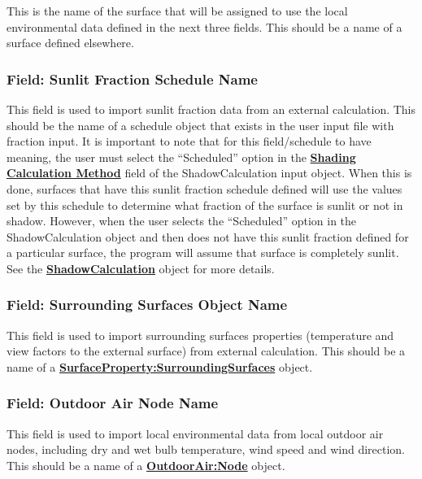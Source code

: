 This is the name of the surface that will be assigned to use the local environmental data defined in the next three fields.  This should be a name of a surface defined elsewhere.

\subsubsection{Field: Sunlit Fraction Schedule Name}\label{field-sunlit-fraction-schedule-name}

This field is used to import sunlit fraction data from an external calculation. This should be the name of a schedule object that exists in the user input file with fraction input. It is important to note that for this field/schedule to have meaning, the user must select the ``Scheduled'' option in the \textbf{\hyperref[field-shading-calculation-method]{Shading Calculation Method}} field of the ShadowCalculation input object. When this is done, surfaces that have this sunlit fraction schedule defined will use the values set by this schedule to determine what fraction of the surface is sunlit or not in shadow.  However, when the user selects the ``Scheduled'' option in the ShadowCalculation object and then does not have this sunlit fraction defined for a particular surface, the program will assume that surface is completely sunlit. See the  \textbf{\hyperref[shadowcalculation]{ShadowCalculation}} object for more details.

\subsubsection{Field: Surrounding Surfaces Object Name}\label{field-surrounding-surfaces-object-name}

This field is used to import surrounding surfaces properties (temperature and view factors to the external surface) from external calculation. This should be a name of a \textbf{\hyperref[surfacePropertySurroundingSurfaces]{SurfaceProperty:SurroundingSurfaces}} object.

\subsubsection{Field: Outdoor Air Node Name}\label{field-outdoor-air-node-name}

This field is used to import local environmental data from local outdoor air nodes, including dry and wet bulb temperature, wind speed and wind direction. This should be a name of a \textbf{\hyperref[outdoorairnode]{OutdoorAir:Node}} object.

